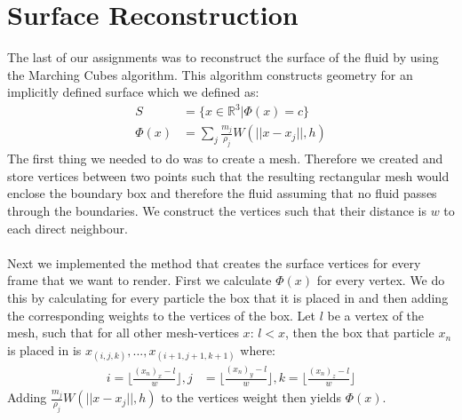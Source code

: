 \documentclass{ACGSeminar}
\begin{document}
\section{Surface Reconstruction}
The last of our assignments was to reconstruct the surface of the fluid by using the Marching Cubes algorithm. This algorithm constructs geometry for an implicitly defined surface which we defined as:
\begin{equation} \label{eq:implicit_surface}
\begin{aligned}
S &=\{ x \in \mathbb{R}^3 | \Phi(x) = c \} \\
\Phi(x) &= \sum_j \frac{m_j}{\rho_j} W(||x-x_j||, h)
\end{aligned}
\end{equation}
The first thing we needed to do was to create a mesh. Therefore we created and store vertices between two points such that the resulting rectangular mesh would enclose the boundary box and therefore the fluid assuming that no fluid passes through the boundaries. We construct the vertices such that their distance is \(w\) to each direct neighbour. \\
\\
Next we implemented the method that creates the surface vertices for every frame that we want to render. First we calculate \(\Phi(x)\) for every vertex. We do this by calculating for every particle the box that it is placed in and then adding the corresponding weights to the vertices of the box. Let \(l\) be a vertex of the mesh, such that for all other mesh-vertices \(x\): \(l < x\), then the box that particle \(x_n\) is placed in is \(x_{(i,j,k)},..., x_{(i+1, j+1, k+1)}\) where: 
\begin{equation} \label{eq:implicit_surface}
\begin{aligned}
i = \lfloor \frac{(x_n)_x - l}{w} \rfloor, j &= \lfloor \frac{(x_n)_y - l}{w} \rfloor, k = \lfloor \frac{(x_n)_z - l}{w} \rfloor
\end{aligned}
\end{equation}
Adding \(\frac{m_j}{\rho_j} W(||x-x_j||, h)\) to the vertices weight then yields \(\Phi(x)\). \\
\\
\end{document}
